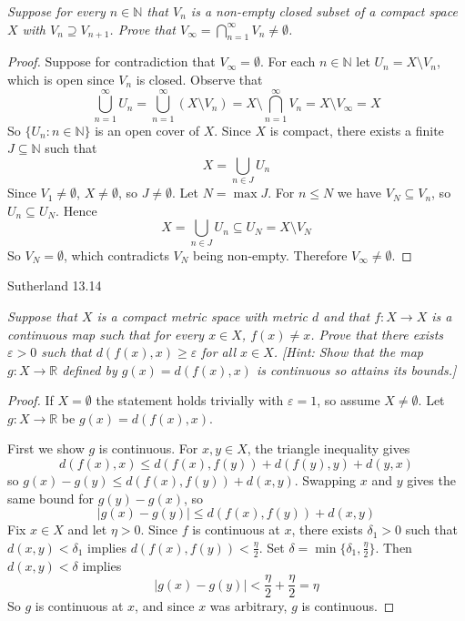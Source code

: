 \documentclass[minion]{homework}
\newcommand{\Reals}{\ensuremath{\mathbb R}}%
\newcommand{\Nats}{\ensuremath{\mathbb N}} %
\begin{document}
\begin{problems}
\textit{Suppose for every $n \in \Nats$ that $V_n$ is a non-empty closed subset of a compact space $X$ with $V_n \supseteq V_{n+1}$. Prove that $V_\infty = \bigcap\limits_{n=1}^{\infty} V_n \neq \emptyset$.}
\newline
\begin{proof}
  Suppose for contradiction that $V_\infty = \emptyset$. For each $n \in \Nats$ let $U_n = X \setminus V_n$, which is open since $V_n$ is closed. Observe that
  $$\bigcup_{n=1}^{\infty} U_n = \bigcup_{n=1}^{\infty} (X \setminus V_n) = X \setminus \bigcap_{n=1}^{\infty} V_n = X \setminus V_\infty = X$$
  So $\{U_n : n \in \Nats\}$ is an open cover of $X$. Since $X$ is compact, there exists a finite $J \subseteq \Nats$ such that
  $$X = \bigcup_{n \in J} U_n$$
  Since $V_1 \neq \emptyset$, $X \neq \emptyset$, so $J \neq \emptyset$. Let $N = \max J$. For $n \leq N$ we have $V_N \subseteq V_n$, so $U_n \subseteq U_N$. Hence
  $$X = \bigcup_{n \in J} U_n \subseteq U_N = X \setminus V_N$$
  So $V_N = \emptyset$, which contradicts $V_N$ being non-empty. Therefore $V_\infty \neq \emptyset$.
\end{proof}
\problem Sutherland 13.14

\textit{Suppose that $X$ is a compact metric space with metric $d$ and that $f \colon X \to X$ is a continuous map such that for every $x \in X$, $f(x) \neq x$. Prove that there exists $\varepsilon > 0$ such that $d(f(x), x) \geq \varepsilon$ for all $x \in X$.
[Hint: Show that the map $g \colon X \to \Reals$ defined by $g(x) = d(f(x), x)$ is continuous so attains its bounds.]}
\newline
\begin{proof}
  If $X = \emptyset$ the statement holds trivially with $\varepsilon = 1$, so assume $X \neq \emptyset$. Let $g \colon X \to \Reals$ be $g(x) = d(f(x), x)$.

  First we show $g$ is continuous. For $x, y \in X$, the triangle inequality gives
  $$d(f(x), x) \leq d(f(x), f(y)) + d(f(y), y) + d(y, x)$$
  so $g(x) - g(y) \leq d(f(x), f(y)) + d(x, y)$. Swapping $x$ and $y$ gives the same bound for $g(y) - g(x)$, so
  $$|g(x) - g(y)| \leq d(f(x), f(y)) + d(x, y)$$
  Fix $x \in X$ and let $\eta > 0$. Since $f$ is continuous at $x$, there exists $\delta_1 > 0$ such that $d(x, y) < \delta_1$ implies $d(f(x), f(y)) < \tfrac{\eta}{2}$.
  Set $\delta = \min\{\delta_1, \tfrac{\eta}{2}\}$. Then $d(x, y) < \delta$ implies
  $$|g(x) - g(y)| < \frac{\eta}{2} + \frac{\eta}{2} = \eta$$
  So $g$ is continuous at $x$, and since $x$ was arbitrary, $g$ is continuous.


\end{proof}
\end{problems}
\end{document}
